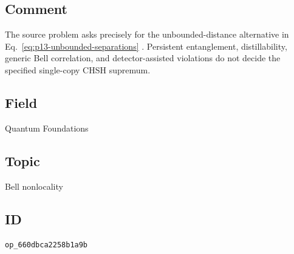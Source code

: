 \subsection*{Comment}

The source problem asks precisely for the unbounded-distance alternative in
Eq.~\eqref{eq:p13-unbounded-separations}
.  Persistent entanglement,
distillability, generic Bell correlation, and detector-assisted violations do
not decide the specified single-copy CHSH supremum.

\subsection*{Field}

Quantum Foundations

\subsection*{Topic}

Bell nonlocality

\subsection*{ID}

\texttt{op\_660dbca2258b1a9b}
